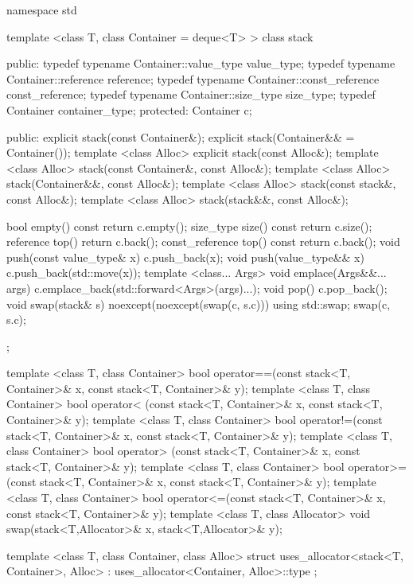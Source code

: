 \begin{codeblock}
namespace std {
  template <class T, class Container = deque<T> >
  class stack {
  public:
    typedef typename Container::value_type            value_type;
    typedef typename Container::reference             reference;
    typedef typename Container::const_reference       const_reference;
    typedef typename Container::size_type             size_type;
    typedef          Container                        container_type;
  protected:
    Container c;

  public:
    explicit stack(const Container&);
    explicit stack(Container&& = Container());
    template <class Alloc> explicit stack(const Alloc&);
    template <class Alloc> stack(const Container&, const Alloc&);
    template <class Alloc> stack(Container&&, const Alloc&);
    template <class Alloc> stack(const stack&, const Alloc&);
    template <class Alloc> stack(stack&&, const Alloc&);

    bool      empty() const             { return c.empty(); }
    size_type size()  const             { return c.size(); }
    reference         top()             { return c.back(); }
    const_reference   top() const       { return c.back(); }
    void push(const value_type& x)      { c.push_back(x); }
    void push(value_type&& x)           { c.push_back(std::move(x)); }
    template <class... Args> void emplace(Args&&... args)
      { c.emplace_back(std::forward<Args>(args)...); }
    void pop()                          { c.pop_back(); }
    void swap(stack& s) noexcept(noexcept(swap(c, s.c)))
      { using std::swap; swap(c, s.c); }
  };

  template <class T, class Container>
    bool operator==(const stack<T, Container>& x, const stack<T, Container>& y);
  template <class T, class Container>
    bool operator< (const stack<T, Container>& x, const stack<T, Container>& y);
  template <class T, class Container>
    bool operator!=(const stack<T, Container>& x, const stack<T, Container>& y);
  template <class T, class Container>
    bool operator> (const stack<T, Container>& x, const stack<T, Container>& y);
  template <class T, class Container>
    bool operator>=(const stack<T, Container>& x, const stack<T, Container>& y);
  template <class T, class Container>
    bool operator<=(const stack<T, Container>& x, const stack<T, Container>& y);
  template <class T, class Allocator>
    void swap(stack<T,Allocator>& x, stack<T,Allocator>& y);

  template <class T, class Container, class Alloc>
    struct uses_allocator<stack<T, Container>, Alloc>
      : uses_allocator<Container, Alloc>::type { };
}
\end{codeblock}

